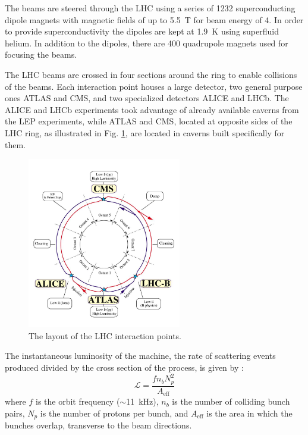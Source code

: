 The beams are steered through the LHC 
using a series of 1232 superconducting dipole magnets with magnetic fields 
of up to 5.5~T for beam energy of 4\TeV. In order to provide superconductivity the 
dipoles are kept at 1.9~K using superfluid helium.
In addition to the dipoles, there are 400 quadrupole magnets used
for focusing the beams.

The LHC beams are
crossed in four sections around the ring to enable collisions of the beams. Each interaction point
houses a large detector, two general purpose ones ATLAS and CMS, and two specialized detectors
ALICE and LHCb. The ALICE and LHCb experiments took advantage of already available caverns from
the LEP experiments, while ATLAS and CMS, located at opposite sides of the LHC ring, as illustrated
in Fig. \ref{fig:lhc}, are located in caverns built specifically for them.

\begin{figure}[htbp]
\centering
\includegraphics[width=0.6\textwidth]{plots/intro/lhc.jpg}
\caption{The layout of the LHC interaction points.\label{fig:lhc}}
\end{figure}

The instantaneous luminosity of the machine, \ie the rate of scattering events produced divided
by the cross section of the process, is given by \cite{Aaij:2011er}:
\begin{equation}
\mathcal{L}=\frac{f n_b N_p^2}{A_{\mathrm{eff}}}
\end{equation}
where $f$ is the orbit frequency ($\sim$11~kHz), $n_b$ is the number of colliding bunch pairs, 
$N_p$ is the number of protons per bunch, and $A_{\mathrm{eff}}$ is the area in which the bunches
overlap, transverse to the beam directions.


